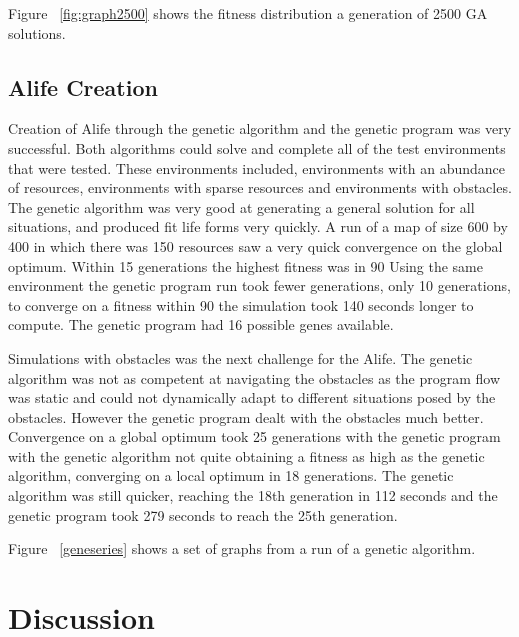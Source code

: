 \documentclass[12pt]{article}
\begin{document}
Figure ~\ref{fig:graph2500} shows the fitness distribution a generation of 2500 GA solutions. 

\subsection{Alife Creation}

Creation of Alife through the genetic algorithm and the genetic program was very successful. Both algorithms could solve and complete all of the test
environments that were tested. These environments included, environments with an abundance of resources, environments with sparse resources and 
environments with obstacles. The genetic algorithm was very good at generating a general solution for all situations, and produced fit life forms
very quickly. A run of a map of size 600 by 400 in which there was 150 resources saw a very quick convergence on the global optimum. Within 
15 generations the highest fitness was in 90%
Using the same environment the genetic program run took fewer generations, only 10 generations, to converge on a fitness within 90%
the simulation took 140 seconds longer to compute. The genetic program had 16 possible genes available. 

Simulations with obstacles was the next challenge for the Alife. The genetic algorithm was not as competent at navigating the obstacles as the
program flow was static and could not dynamically adapt to different situations posed by the obstacles. However the genetic program dealt with
the obstacles much better. Convergence on a global optimum took 25 generations with the genetic program with the genetic algorithm not quite obtaining
a fitness as high as the genetic algorithm, converging on a local optimum in 18 generations. The genetic algorithm was still quicker, reaching the 18th generation
in 112 seconds and the genetic program took 279 seconds to reach the 25th generation.

Figure ~\ref{geneseries} shows a set of graphs from a run of a genetic algorithm. 




\section{Discussion}
\end{document}
